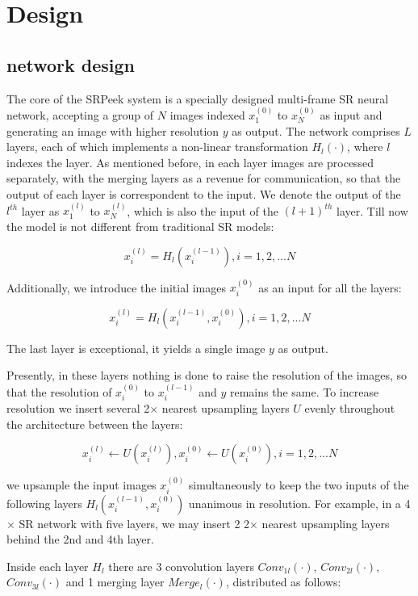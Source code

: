 \section{Design}
\label{sec-design}

\subsection{network design}


The core of the \textsf{SRPeek} system is a specially designed multi-frame SR neural network, accepting a group of $N$ images indexed $x_1^{(0)}$ to $x_N^{(0)}$ as input and generating an image with higher resolution $y$ as output. The network comprises $L$ layers, each of which implements a non-linear transformation $H_l(\cdot)$, where $l$ indexes the layer. As mentioned before, in each layer images are processed separately, with the merging layers as a revenue for communication, so that the output of each layer is correspondent to the input.  We denote the output of the $l^{th}$ layer as $x_1^{(l)}$ to $x_N^{(l)}$, which is also the input of the $(l+1)^{th}$ layer. Till now the model is not different from traditional SR models:

$$x_i^{(l)} = H_l(x_i^{(l-1)}), i=1,2,...N$$


Additionally, we introduce the initial images $x_i^{(0)}$ as an input for all the layers:

$$x_i^{(l)} = H_l(x_i^{(l-1)},x_i^{(0)}), i=1,2,...N$$

The last layer is exceptional, it yields a single image $y$ as output. 

Presently, in these layers nothing is done to raise the resolution of the images, so that the resolution of $x_i^{(0)}$ to $x_i^{(l-1)}$ and $y$ remains the same. To increase resolution we insert several 2$\times$ nearest upsampling layers $U$ evenly throughout the architecture between the layers:

$$x_i^{(l)} \leftarrow U(x_i^{(l)}), x_i^{(0)} \leftarrow U(x_i^{(0)}), i=1,2,...N$$

we upsample the input images $x_i^{(0)}$ simultaneously to keep the two inputs of the following layers $H_l(x_i^{(l-1)},x_i^{(0)})$ unanimous in resolution. For example, in a 4$\times$ SR network with five layers, we may insert 2 2$\times$ nearest upsampling layers behind the 2nd and 4th layer.

Inside each layer $H_l$ there are 3 convolution layers $Conv_{1l}(\cdot)$, $Conv_{2l}(\cdot)$, $Conv_{3l}(\cdot)$ and 1 merging layer $Merge_l(\cdot)$, distributed as follows:

